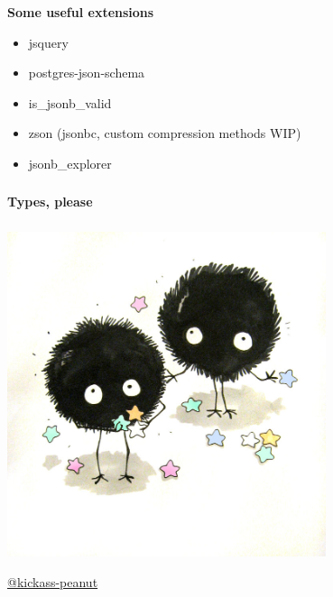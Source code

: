 \documentclass[usenames,dvipsnames, 18pt, compress, aspectratio=169]{beamer}
\begin{document}

\begin{frame}
    \frametitle{}
    \begin{center}
        \textbf{Some useful extensions}

        \begin{itemize}[label={\MVRightarrow}]
            \item jsquery
            \item postgres-json-schema
            \item is\_jsonb\_valid
            \item zson (jsonbc, custom compression methods WIP)
            \item jsonb\_explorer
        \end{itemize}

    \end{center}
\end{frame}

\begin{frame}
    \frametitle{}
    \begin{center}
    \textbf{Types, please}

    \end{center}
\end{frame}

\begin{frame}
    \frametitle{}
    \begin{center}

        \includegraphics[width=0.7\textwidth,center]{fuzzy.jpg}

        \vspace{-2cm}
        \tiny{\href{https://kickass-peanut.deviantart.com/}{@kickass-peanut}}

    \end{center}
\end{frame}
\end{document}
